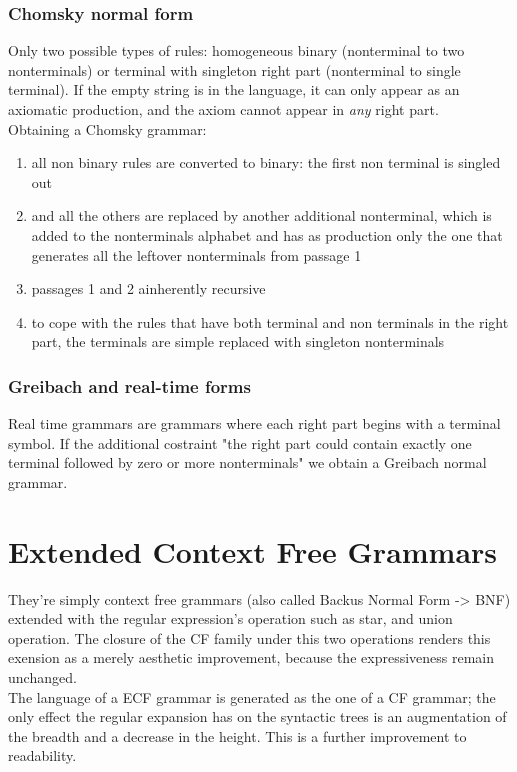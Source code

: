 		\subsubsection{Chomsky normal form}
			Only two possible types of rules: homogeneous binary (nonterminal to two nonterminals) or terminal with singleton right part (nonterminal to single terminal). If the empty string is in the language, it can only appear as an axiomatic production, and the axiom cannot appear in \emph{any} right part.\\
			Obtaining a Chomsky grammar:
			\begin{enumerate}
				\item all non binary rules are converted to binary: the first non terminal is singled out 
				\item and all the others are replaced by another additional nonterminal, which is added to the nonterminals alphabet and has as production only the one that generates all the leftover nonterminals from passage 1
				\item passages 1 and 2 ainherently recursive
				\item to cope with the rules that have both terminal and non terminals in the right part, the terminals are simple replaced with singleton nonterminals
			\end{enumerate}
		\subsubsection{Greibach and real-time forms}
			Real time grammars are grammars where each right part begins with a terminal symbol. If the additional costraint "the right part could contain exactly one terminal followed by zero or more nonterminals" we obtain a Greibach normal grammar.
			 
	\section{Extended Context Free Grammars}
		They're simply context free grammars (also called Backus Normal Form -> BNF) extended with the regular expression's operation such as star, and union operation. The closure of the CF family under this two operations renders this exension as a merely aesthetic improvement, because the expressiveness remain unchanged.\\
		The language of a ECF grammar is generated as the one of a CF grammar; the only effect the regular expansion has on the syntactic trees is an augmentation of the breadth and a decrease in the height. This is a further improvement to readability.
	
